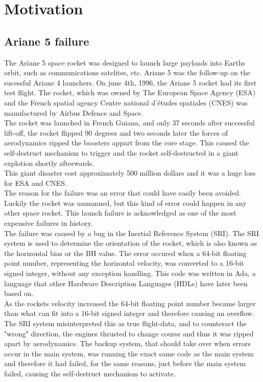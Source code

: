 \documentclass[a4paper]{report}
\begin{document}
\section{Motivation}
\subsection{Ariane 5 failure}
The Ariane 5 space rocket\cite{InquiryBoard1996} was designed to launch large payloads into Earths orbit, such as communications satelites, etc. Ariane 5 was the follow-up on the sucessful Ariane 4 launchers. On june 4th, 1996, the Ariane 5 rocket had its first test flight. The rocket, which was owned by The European Space Agency (ESA) and the French spatial agency Centre national d'\'etudes spatiales (CNES) was manufactured by Airbus Defence and Space.\\ The rocket was launched in French Guiana, and only 37 seconds after successful lift-off, the rocket flipped 90 degrees and two seconds later the forces of aerodynamics ripped the boosters appart from the core stage. This caused the self-destruct mechanism to trigger and the rocket self-destructed in a giant explotion shortly afterwards.\\ This giant disaster cost approximately 500 million dollars and it was a huge loss for ESA and CNES.  \\
The reason for the failure was an error that could have easily been avoided. Luckily the rocket was unmanned, but this kind of error could happen in any other space rocket. This launch failure is acknowledged as one of the most expensive failures in history. \\
The failure was caused by a bug in the Inertial Reference System (SRI). The SRI system is used to determine the orientation of the rocket, which is also known as the horizontal bias or the BH value. The error occured when a 64-bit floating point number, representing the horizontal velocity, was converted to a 16-bit signed integer, without any exception handling. This code was written in Ada, a language that other Hardware Description Languages (HDLs) have later been based on.\\ As the rockets velocity increased the 64-bit floating point number became larger than what can fit into a 16-bit signed integer and therefore causing an overflow. The SRI system misinterpreted this as true flight-data, and to counteract the "wrong" direction, the engines thrusted to change course and thus it was ripped apart by aerodynamics. The backup system, that should take over when errors occur in the main system, was running the exact same code as the main system and therefore it had failed, for the same reasons, just before the main system failed, causing the self-destruct mechanism to activate.\\
\end{document}
